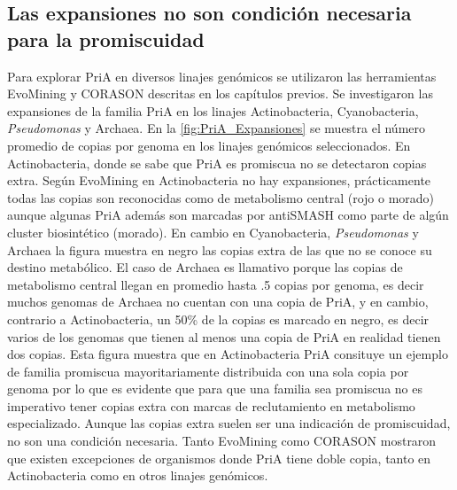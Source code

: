 \documentclass[12pt,twoside]{reedthesis}
\begin{document}
  \subsection{Las expansiones no son condición necesaria para la
  promiscuidad}\label{las-expansiones-no-son-condicion-necesaria-para-la-promiscuidad}
  
  Para explorar PriA en diversos linajes genómicos se utilizaron las
  herramientas EvoMining y CORASON descritas en los capítulos previos. Se
  investigaron las expansiones de la familia PriA en los linajes
  Actinobacteria, Cyanobacteria, \emph{Pseudomonas} y Archaea. En la
  \autoref{fig:PriA_Expansiones} se muestra el número promedio de copias
  por genoma en los linajes genómicos seleccionados. En Actinobacteria,
  donde se sabe que PriA es promiscua no se detectaron copias extra. Según
  EvoMining en Actinobacteria no hay expansiones, prácticamente todas las
  copias son reconocidas como de metabolismo central (rojo o morado)
  aunque algunas PriA además son marcadas por antiSMASH como parte de
  algún cluster biosintético (morado). En cambio en Cyanobacteria,
  \emph{Pseudomonas} y Archaea la figura muestra en negro las copias extra
  de las que no se conoce su destino metabólico. El caso de Archaea es
  llamativo porque las copias de metabolismo central llegan en promedio
  hasta .5 copias por genoma, es decir muchos genomas de Archaea no
  cuentan con una copia de PriA, y en cambio, contrario a Actinobacteria,
  un 50\% de la copias es marcado en negro, es decir varios de los genomas
  que tienen al menos una copia de PriA en realidad tienen dos copias.
  Esta figura muestra que en Actinobacteria PriA consituye un ejemplo de
  familia promiscua mayoritariamente distribuida con una sola copia por
  genoma por lo que es evidente que para que una familia sea promiscua no
  es imperativo tener copias extra con marcas de reclutamiento en
  metabolismo especializado. Aunque las copias extra suelen ser una
  indicación de promiscuidad, no son una condición necesaria. Tanto
  EvoMining como CORASON mostraron que existen excepciones de organismos
  donde PriA tiene doble copia, tanto en Actinobacteria como en otros
  linajes genómicos.
  
\end{document}
